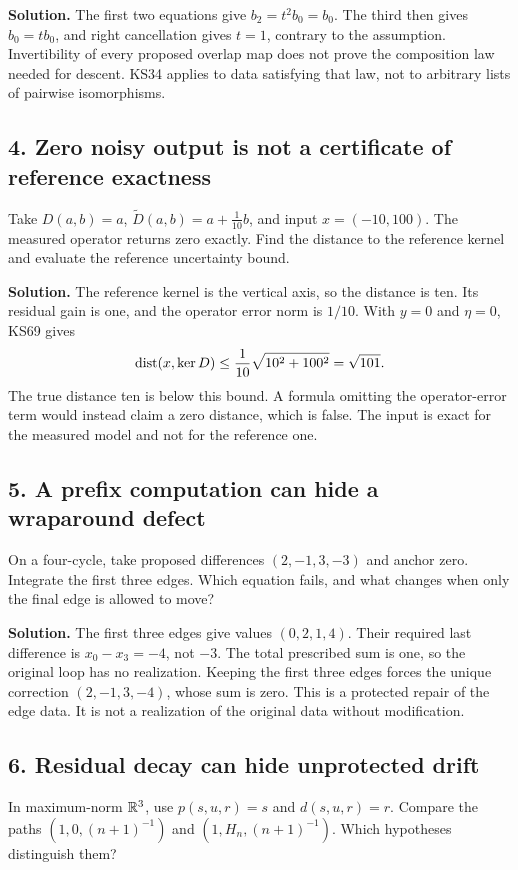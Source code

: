 \textbf{Solution.} The first two equations give \(b_2=t^2b_0=b_0\). The third then gives \(b_0=tb_0\), and right cancellation gives \(t=1\), contrary to the assumption. Invertibility of every proposed overlap map does not prove the composition law needed for descent. KS34 applies to data satisfying that law, not to arbitrary lists of pairwise isomorphisms.

\subsection*{4. Zero noisy output is not a certificate of reference exactness}
Take \(D(a,b)=a\), \(\widetilde D(a,b)=a+\tfrac1{10}b\), and input \(x=(-10,100)\). The measured operator returns zero exactly. Find the distance to the reference kernel and evaluate the reference uncertainty bound.

\textbf{Solution.} The reference kernel is the vertical axis, so the distance is ten. Its residual gain is one, and the operator error norm is \(1/10\). With \(y=0\) and \(\eta=0\), KS69 gives
\[
 \operatorname{dist}(x,\ker D)\le\frac1{10}\sqrt{10^2+100^2}=\sqrt{101}.
\]
The true distance ten is below this bound. A formula omitting the operator-error term would instead claim a zero distance, which is false. The input is exact for the measured model and not for the reference one.

\subsection*{5. A prefix computation can hide a wraparound defect}
On a four-cycle, take proposed differences \((2,-1,3,-3)\) and anchor zero. Integrate the first three edges. Which equation fails, and what changes when only the final edge is allowed to move?

\textbf{Solution.} The first three edges give values \((0,2,1,4)\). Their required last difference is \(x_0-x_3=-4\), not \(-3\). The total prescribed sum is one, so the original loop has no realization. Keeping the first three edges forces the unique correction \((2,-1,3,-4)\), whose sum is zero. This is a protected repair of the edge data. It is not a realization of the original data without modification.

\subsection*{6. Residual decay can hide unprotected drift}
In maximum-norm $\mathbb R^3$, use $p(s,u,r)=s$ and $d(s,u,r)=r$. Compare the paths $(1,0,(n+1)^{-1})$ and $(1,H_n,(n+1)^{-1})$. Which hypotheses distinguish them?

